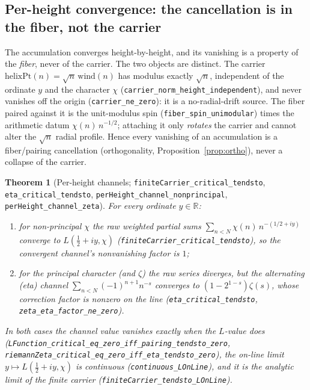 \documentclass[11pt]{article}
\newtheorem{theorem}[definition]{Theorem}
\newcommand{\R}{\mathbb{R}}
\newcommand{\code}[1]{\texttt{#1}}
\begin{document}
\subsection{Per-height convergence: the cancellation is in the fiber, not the carrier}\label{sub:perheight}

The accumulation converges height-by-height, and its vanishing is a property of the \emph{fiber},
never of the carrier. The two objects are distinct. The carrier
$\mathrm{helixPt}(n)=\sqrt n\,\mathrm{wind}(n)$ has modulus exactly $\sqrt n$, independent of the
ordinate $y$ and the character $\chi$ (\code{carrier\_norm\_height\_independent}), and never vanishes
off the origin (\code{carrier\_ne\_zero}): it is a no-radial-drift source. The fiber paired against it
is the unit-modulus spin (\code{fiber\_spin\_unimodular}) times the arithmetic datum
$\chi(n)\,n^{-1/2}$; attaching it only \emph{rotates} the carrier and cannot alter the $\sqrt n$
radial profile. Hence every vanishing of an accumulation is a fiber/pairing cancellation
(orthogonality, Proposition~\ref{prop:ortho}), never a collapse of the carrier.

\begin{theorem}[Per-height channels; \code{finiteCarrier\_critical\_tendsto}, \code{eta\_critical\_tendsto}, \code{perHeight\_channel\_nonprincipal}, \code{perHeight\_channel\_zeta}]\label{thm:perheight}
For every ordinate $y\in\R$:
\begin{enumerate}[label=\textup{(\roman*)}]
\item for non-principal $\chi$ the raw weighted partial sums $\sum_{n<N}\chi(n)\,n^{-(1/2+iy)}$
converge to $L(\tfrac12+iy,\chi)$ (\code{finiteCarrier\_critical\_tendsto}), so the convergent channel's
nonvanishing factor is $1$;
\item for the principal character (and $\zeta$) the raw series diverges, but the alternating (eta)
channel $\sum_{n<N}(-1)^{n+1}n^{-s}$ converges to $(1-2^{1-s})\zeta(s)$, whose correction factor is
nonzero on the line (\code{eta\_critical\_tendsto}, \code{zeta\_eta\_factor\_ne\_zero}).
\end{enumerate}
In both cases the channel value vanishes exactly when the $L$-value does
(\code{LFunction\_critical\_eq\_zero\_iff\_pairing\_tendsto\_zero},
\code{riemannZeta\_critical\_eq\_zero\_iff\_eta\_tendsto\_zero}), the on-line limit
$y\mapsto L(\tfrac12+iy,\chi)$ is continuous (\code{continuous\_LOnLine}), and it is the analytic limit
of the finite carrier (\code{finiteCarrier\_tendsto\_LOnLine}).
\end{theorem}
\end{document}
